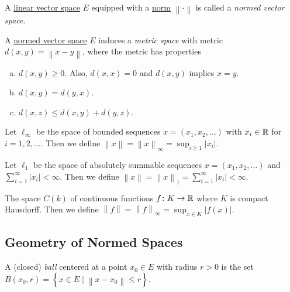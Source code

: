 \begin{definition}\label{def:normed-vector-space}
	A \hyperref[def:linear-vector-space]{linear vector space} \(E\) equipped with a \hyperref[def:norm]{norm} \(\left\lVert \cdot\right\rVert \) is called a \emph{normed vector space}.
\end{definition}

\begin{remark}
	A \hyperref[def:normed-vector-space]{normed vector space} \(E\) induces a \emph{metric space} with metric \(d(x, y) = \left\lVert x- y\right\rVert \), where the metric has properties
	\begin{enumerate}[(a)]
		\item \(d(x, y) \geq 0\). Also, \(d(x, x) = 0\) and \(d(x, y)\) implies \(x =y\).
		\item \(d(x, y) = d(y, x)\).
		\item \(d(x, z) \leq d(x, y) + d(y, z)\).
	\end{enumerate}
\end{remark}

\begin{eg}
	Let \(\ell _\infty \) be the space of bounded sequences \(x = (x_1, x_2, \ldots )\) with \(x_i\in \mathbb{\MakeUppercase{r}} \) for \(i = 1, 2, \ldots \). Then we define \(\left\lVert x\right\rVert = \left\lVert x\right\rVert _\infty = \sup _{i \geq 1}\left\vert x_i \right\vert \).
\end{eg}

\begin{eg}
	Let \(\ell _1\) be the space of absolutely summable sequences \(x = (x_1, x_2, \ldots)\) and \(\sum_{i=1}^{\infty} \left\vert x_i \right\vert < \infty\). Then we define \(\left\lVert x\right\rVert = \left\lVert x\right\rVert _1 = \sum_{i=1}^{\infty} \left\vert x_i \right\vert < \infty\).
\end{eg}

\begin{eg}
	The space \(C(k)\) of continuous functions \(f\colon K\to \mathbb{\MakeUppercase{r}} \) where \(K\) is compact Hausdorff. Then we define \(\left\lVert f\right\rVert = \left\lVert f\right\rVert _\infty = \sup _{x\in K}\left\vert f(x) \right\vert \).
\end{eg}

\subsection{Geometry of Normed Spaces}
\begin{definition}[Ball]\label{def:ball}
	A (closed) \emph{ball} centered at a point \(x_0\in E\) with radius \(r>0\) is the set \(B(x_0, r) = \left\{ x\in E\mid \left\lVert x - x_0\right\rVert \leq r \right\} \).
\end{definition}

